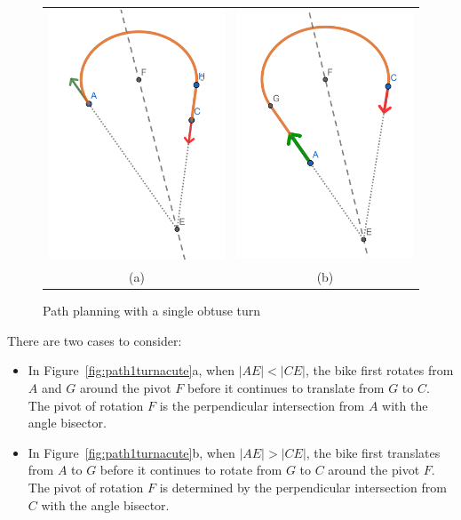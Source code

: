 \documentclass{article}
\begin{document}
\begin{figure}[h]
  \begin{tabular}{cc}
    \includegraphics[width=6cm]{screenshots/single-obtuse-turn-rot-trans.png} & 
    \includegraphics[width=6cm]{screenshots/single-obtuse-turn-trans-rot.png}       \\
    (a)                                                                       & (b) \\
  \end{tabular}
  \caption{Path planning with a single obtuse turn}
  \label{fig:path1turnobtuse}
\end{figure}


There are two cases to consider:
\begin{itemize}
  \item In Figure~\ref{fig:path1turnacute}a, when $|AE| < |CE|$, the bike first rotates from $A$ and $G$ around the
        pivot $F$  before it continues to translate from $G$ to $C$. The pivot of rotation $F$ is the perpendicular
        intersection from $A$ with the angle bisector.
  \item In Figure~\ref{fig:path1turnacute}b, when $|AE| > |CE|$, the bike first translates from $A$ to $G$ before it
        continues to rotate from $G$ to $C$ around the pivot $F$. The pivot of rotation $F$ is determined
        by the perpendicular intersection from $C$ with the angle bisector.
\end{itemize}
\end{document}
